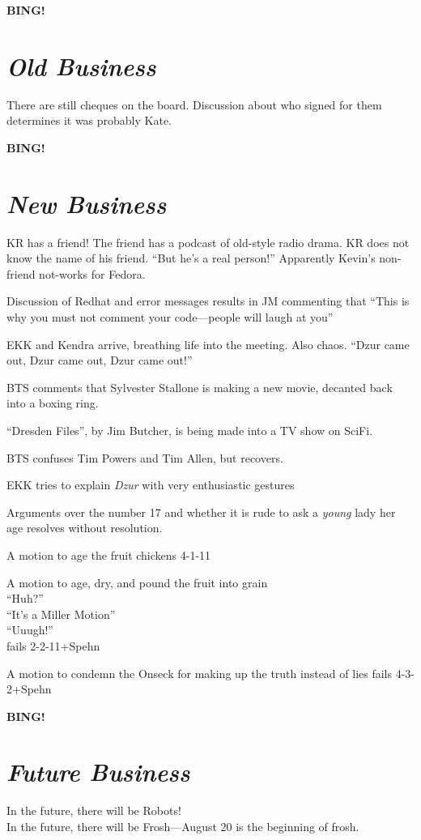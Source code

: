 \documentclass[10pt]{article}
\newcommand{\bing}{{\bf BING!} }
\newcommand{\goto}[1]{\bing \vskip 12pt \section*{{\em{#1}}}}
\begin{document}


\goto{Old Business}
There are still cheques on the board.
Discussion about who signed for them determines it was probably Kate.

\goto{New Business}
KR has a friend! The friend has a podcast of old-style radio drama. KR
does not know the name of his friend. ``But he's a real person!''
Apparently Kevin's non-friend not-works for Fedora.

Discussion of Redhat and error messages results in JM commenting that
``This is why you must not comment your code---people will laugh at
you'' 

EKK and Kendra arrive, breathing life into the meeting. Also chaos.
``Dzur came out, Dzur came out, Dzur came out!'' 

BTS comments that Sylvester Stallone is making a new movie, decanted
back into a boxing ring.

``Dresden Files'', by Jim Butcher, is being made into a TV show on
SciFi.

BTS confuses Tim Powers and Tim Allen, but recovers.

EKK tries to explain \emph{Dzur} with very enthusiastic gestures

Arguments over the number 17 and whether it is rude to ask a
\emph{young} lady her age resolves without resolution.

A motion to age the fruit chickens 4-1-11 

A motion to age, dry, and pound the fruit into grain \\
``Huh?''\\
``It's a Miller Motion''\\
``Uuugh!''\\
fails  2-2-11+Spehn

A motion to condemn the Onseck for making up the truth instead of lies
fails 4-3-2+Spehn

\goto{Future Business}
In the future, there will be Robots!\\
In the future, there will be Frosh---August 20 is the beginning of
frosh.
\end{document}
